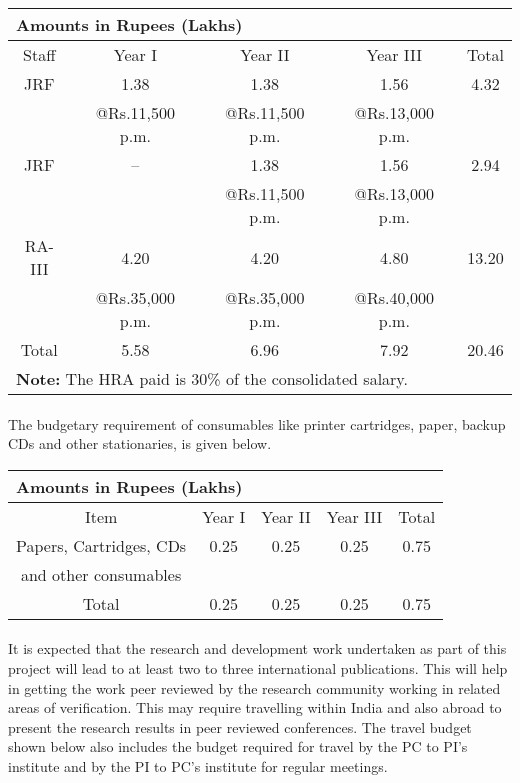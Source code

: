 \documentclass[12pt]{article}
\begin{document}
\begin{center}
\begin{tabular}{|c|c|c|c|c|}
\multicolumn{5}{l}{\bf Amounts in Rupees (Lakhs)}\\
\hline
Staff & Year I & Year II & Year III & Total \\
\hline
JRF & 1.38 & 1.38 & 1.56 & 4.32 \\
 & @Rs.11,500 p.m. & @Rs.11,500 p.m. & @Rs.13,000 p.m. & \\
\hline
JRF & -- & 1.38 & 1.56 & 2.94 \\
 & & @Rs.11,500 p.m. & @Rs.13,000 p.m. & \\
\hline
RA-III & 4.20 & 4.20 & 4.80 & 13.20 \\
 & @Rs.35,000 p.m. & @Rs.35,000 p.m. & @Rs.40,000 p.m. & \\
\hline
Total & 5.58 & 6.96 & 7.92 & 20.46 \\
\hline
\multicolumn{5}{l}{{\bf Note:} The HRA paid is 30\% of the consolidated salary.}
\end{tabular}
\end{center}



\paragraph{} The budgetary requirement of consumables like printer
cartridges, paper, backup CDs and other stationaries, is given below.

\begin{center}
\begin{tabular}{|c|c|c|c|c|}
\multicolumn{5}{l}{\bf Amounts in Rupees (Lakhs)}\\
\hline
Item & Year I & Year II & Year III & Total \\
\hline
Papers, Cartridges, CDs & 0.25 & 0.25 & 0.25 & 0.75 \\
and other consumables & & & & \\
\hline
Total & 0.25 & 0.25 & 0.25 & 0.75 \\
\hline
\end{tabular}
\end{center}

\newpage


\paragraph{} It is expected that the research and development work
undertaken as part of this project will lead to at least two to three
international publications. This will help in getting the work peer
reviewed by the research community working in related areas of
verification. This may require travelling within India and also abroad
to present the research results in peer reviewed conferences. The
travel budget shown below also includes the budget required for travel
by the PC to PI's institute and by the PI to PC's institute for
regular meetings.
\end{document}
